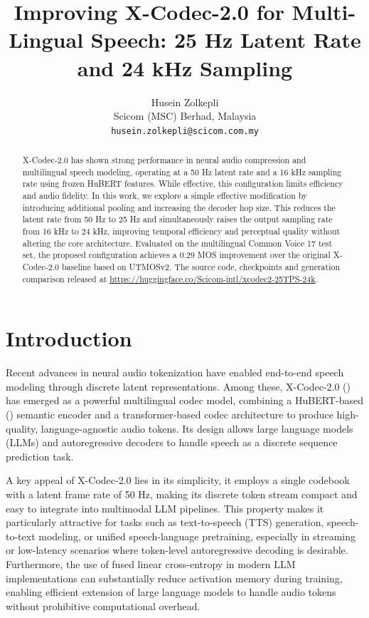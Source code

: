 \documentclass[preprint]{article}
\title{Improving X-Codec-2.0 for Multi-Lingual Speech: 25 Hz Latent Rate and 24 kHz Sampling}
\author{
  Husein Zolkepli \\
  Scicom (MSC) Berhad, Malaysia \\
  \texttt{husein.zolkepli@scicom.com.my}
}
\begin{document}
\maketitle

\begin{abstract}

X-Codec-2.0 has shown strong performance in neural audio compression and multilingual speech modeling, operating at a 50 Hz latent rate and a 16 kHz sampling rate using frozen HuBERT features. While effective, this configuration limits efficiency and audio fidelity.
In this work, we explore a simple effective modification by introducing additional pooling and increasing the decoder hop size. This reduces the latent rate from 50 Hz to 25 Hz and simultaneously raises the output sampling rate from 16 kHz to 24 kHz, improving temporal efficiency and perceptual quality without altering the core architecture.
Evaluated on the multilingual Common Voice 17 test set, the proposed configuration achieves a 0.29 MOS improvement over the original X-Codec-2.0 baseline based on UTMOSv2. The source code, checkpoints and generation comparison released at \href{https://huggingface.co/Scicom-intl/xcodec2-25TPS-24k}{https://huggingface.co/Scicom-intl/xcodec2-25TPS-24k}.

\end{abstract}

\section{Introduction}

Recent advances in neural audio tokenization have enabled end-to-end speech modeling through discrete latent representations.  
Among these, X-Codec-2.0 (\citet{ye2024codecdoesmatterexploring}) has emerged as a powerful multilingual codec model, combining a HuBERT-based (\citet{hsu2021hubertselfsupervisedspeechrepresentation}) semantic encoder and a transformer-based codec architecture to produce high-quality, language-agnostic audio tokens.  
Its design allows large language models (LLMs) and autoregressive decoders to handle speech as a discrete sequence prediction task.  

A key appeal of X-Codec-2.0 lies in its simplicity, it employs a single codebook with a latent frame rate of 50 Hz, making its discrete token stream compact and easy to integrate into multimodal LLM pipelines.
This property makes it particularly attractive for tasks such as text-to-speech (TTS) generation, speech-to-text modeling, or unified speech-language pretraining, especially in streaming or low-latency scenarios where token-level autoregressive decoding is desirable.
Furthermore, the use of fused linear cross-entropy in modern LLM implementations can substantially reduce activation memory during training, enabling efficient extension of large language models to handle audio tokens without prohibitive computational overhead.
\end{document}
